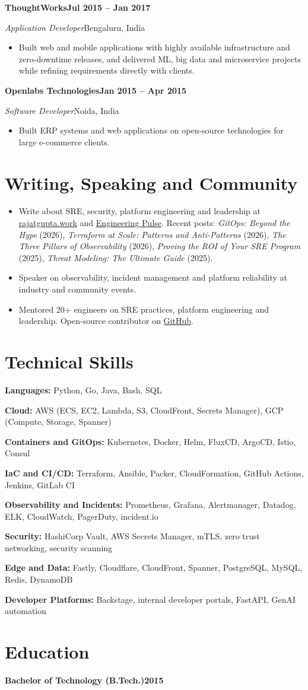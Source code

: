 \documentclass[10pt,a4paper]{article}
\newcommand{\job}[4]{%
  \par\addvspace{0.9ex}%
  {\bfseries #1}\hfill{\bfseries #2}\par
  {\itshape #3}\hfill{\color{muted}#4}\par}
\newcommand{\skill}[2]{\textbf{#1:} #2\par\addvspace{0.25ex}}
\begin{document}
\job{ThoughtWorks}{Jul 2015 -- Jan 2017}{Application Developer}{Bengaluru, India}
\begin{itemize}
  \item Built web and mobile applications with highly available infrastructure and zero-downtime releases, and delivered ML, big data and microservice projects while refining requirements directly with clients.
\end{itemize}

\job{Openlabs Technologies}{Jan 2015 -- Apr 2015}{Software Developer}{Noida, India}
\begin{itemize}
  \item Built ERP systems and web applications on open-source technologies for large e-commerce clients.
\end{itemize}

\section{Writing, Speaking and Community}
\begin{itemize}
  \item Write about SRE, security, platform engineering and leadership at \href{https://rajatgupta.work/posts/}{rajatgupta.work} and \href{https://pulse.rajatgupta.work}{Engineering Pulse}. Recent posts: \textit{GitOps: Beyond the Hype} (2026), \textit{Terraform at Scale: Patterns and Anti-Patterns} (2026), \textit{The Three Pillars of Observability} (2026), \textit{Proving the ROI of Your SRE Program} (2025), \textit{Threat Modeling: The Ultimate Guide} (2025).
  \item Speaker on observability, incident management and platform reliability at industry and community events.
  \item Mentored 20+ engineers on SRE practices, platform engineering and leadership. Open-source contributor on \href{https://github.com/rajatguptarg}{GitHub}.
\end{itemize}

\section{Technical Skills}
\skill{Languages}{Python, Go, Java, Bash, SQL}
\skill{Cloud}{AWS (ECS, EC2, Lambda, S3, CloudFront, Secrets Manager), GCP (Compute, Storage, Spanner)}
\skill{Containers and GitOps}{Kubernetes, Docker, Helm, FluxCD, ArgoCD, Istio, Consul}
\skill{IaC and CI/CD}{Terraform, Ansible, Packer, CloudFormation, GitHub Actions, Jenkins, GitLab CI}
\skill{Observability and Incidents}{Prometheus, Grafana, Alertmanager, Datadog, ELK, CloudWatch, PagerDuty, incident.io}
\skill{Security}{HashiCorp Vault, AWS Secrets Manager, mTLS, zero trust networking, security scanning}
\skill{Edge and Data}{Fastly, Cloudflare, CloudFront, Spanner, PostgreSQL, MySQL, Redis, DynamoDB}
\skill{Developer Platforms}{Backstage, internal developer portals, FastAPI, GenAI automation}

\section{Education}
{\bfseries Bachelor of Technology (B.Tech.)}\hfill{\bfseries 2015}\par
\end{document}
